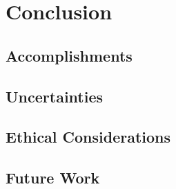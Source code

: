 \section{Conclusion}
\subsection{Accomplishments}
\subsection{Uncertainties}
\subsection{Ethical Considerations}
\subsection{Future Work}